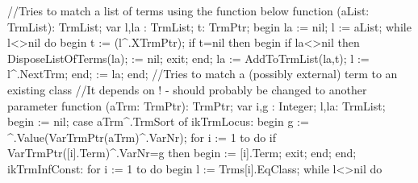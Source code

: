 //Tries to match a list of terms using the function below
function (aList: TrmList): TrmList;
var
   l,la : TrmList;
   t: TrmPtr;
begin
   la := nil;
   l := aList;
   while l<>nil do
   begin
      t := (l^.XTrmPtr);
      if t=nil then
      begin
         if la<>nil then DisposeListOfTerms(la);
          := nil;
         exit;
      end;
      la := AddToTrmList(la,t);
      l := l^.NextTrm;
   end;
    := la;
end;
\eatline
{}\nwendcode{}\nwdocspar
\nwenddocs{}\endmoddef\nwstartdeflinemarkup\nwenddeflinemarkup
//Tries to match a (possibly external) term to an existing class
//It depends on ! - should probably be changed to another parameter
function (aTrm: TrmPtr): TrmPtr;
var
   i,g : Integer;
   l,la: TrmList;
begin
    := nil;
   case aTrm^.TrmSort of
      ikTrmLocus:
         begin
            g := ^.Value(VarTrmPtr(aTrm)^.VarNr);
            for i := 1 to  do
               if VarTrmPtr([i].Term)^.VarNr=g then
               begin  := [i].Term;
               exit;
               end;
         end;
      ikTrmInfConst:
         for i := 1 to  do
         begin
            l := Trms[i].EqClass;
            while l<>nil do

